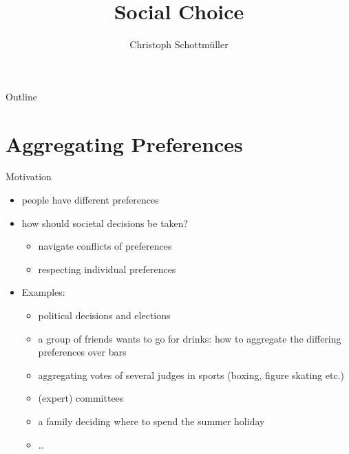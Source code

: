 \documentclass[bigger]{beamer}
\author{Christoph Schottmüller}
\date{}
\title{Social Choice}
\begin{document}
\maketitle
\begin{frame}{Outline}
\tableofcontents
\end{frame}


\section{Aggregating Preferences}
\label{sec:org51ec6be}
\begin{frame}[label={sec:org3360cd7}]{Motivation}
\begin{itemize}
\item people have different preferences
\item how should societal decisions be taken?
\begin{itemize}
\item navigate conflicts of preferences
\item respecting individual preferences
\end{itemize}
\item Examples:
\begin{itemize}
\item political decisions and elections
\item a group of friends wants to go for drinks: how to aggregate the differing preferences over bars
\item aggregating votes of several judges in sports (boxing, figure skating etc.)
\item (expert) committees
\item a family deciding where to spend the summer holiday
\item \ldots{}
\end{itemize}
\end{itemize}
\end{frame}
\end{document}
